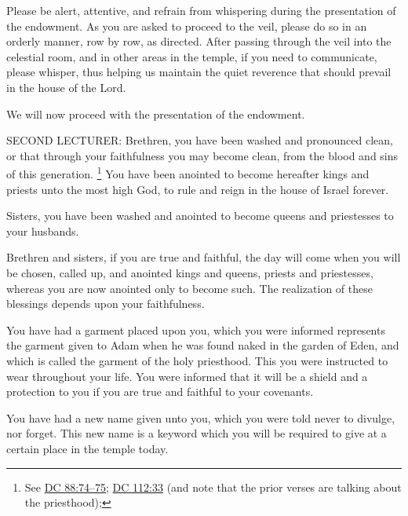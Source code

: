 			Please be alert, attentive, and refrain from whispering during the presentation of the endowment. As you are asked to proceed to the veil, please do so in an orderly manner, row by row, as directed. After passing through the veil into the celestial room, and in other areas in the temple, if you need to communicate, please whisper, thus helping us maintain the quiet reverence that should prevail in the house of the Lord.

			We will now proceed with the presentation of the endowment.
			
			SECOND LECTURER: Brethren, you have been washed and pronounced clean, or that through your faithfulness you may become clean, from the blood and sins of this generation.%
				\footnote{%
					See \hyperref[DC88-74]{DC 88:74--75}; \hyperref[DC112-33]{DC 112:33} (and note that the prior verses are talking about the priesthood); 
					}
			You have been anointed to become hereafter kings and priests unto the most high God, to rule and reign in the house of Israel forever.

			Sisters, you have been washed and anointed to become queens and priestesses to your husbands.

			Brethren and sisters, if you are true and faithful, the day will come when you will be chosen, called up, and anointed kings and queens, priests and priestesses, whereas you are now anointed only to become such. The realization of these blessings depends upon your faithfulness.

			You have had a garment placed upon you, which you were informed represents the garment given to Adam when he was found naked in the garden of Eden, and which is called the garment of the holy priesthood. This you were instructed to wear throughout your life. You were informed that it will be a shield and a protection to you if you are true and faithful to your covenants.

			You have had a new name given unto you, which you were told never to divulge, nor forget. This new name is a keyword which you will be required to give at a certain place in the temple today.

